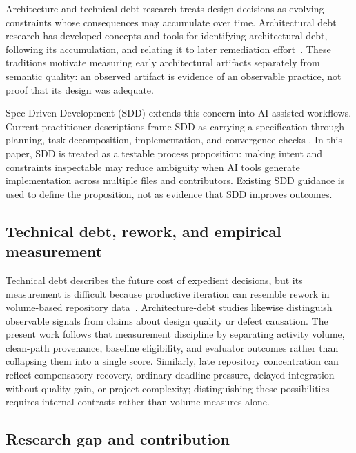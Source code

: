 Architecture and technical-debt research treats design decisions as evolving
constraints whose consequences may accumulate over time. Architectural debt
research has developed concepts and tools for identifying architectural debt,
following its accumulation, and relating it to later remediation
effort~\cite{verdecchia2018architectural,nayebi2019longitudinal}.
These traditions motivate measuring early architectural artifacts separately
from semantic quality: an observed artifact is evidence of an observable
practice, not proof that its design was adequate.

Spec-Driven Development (SDD) extends this concern into AI-assisted workflows.
Current practitioner descriptions frame SDD as carrying a specification through
planning, task decomposition, implementation, and convergence checks
\cite{github2025spec,thoughtworks202Xspec}. In this paper, SDD is treated as a
testable process proposition: making intent and constraints inspectable may
reduce ambiguity when AI tools generate implementation across multiple files
and contributors. Existing SDD guidance is used to define the proposition, not
as evidence that SDD improves outcomes.

\subsection{Technical debt, rework, and empirical measurement}

Technical debt describes the future cost of expedient decisions, but its
measurement is difficult because productive iteration can resemble rework in
volume-based repository data~\cite{cunningham_1992_technical_debt,fowler2009technicaldebt,kruchten2012technicaldebt}.
Architecture-debt studies likewise distinguish observable signals from claims
about design quality or defect causation. The present work follows that
measurement discipline by separating activity volume, clean-path provenance,
baseline eligibility, and evaluator outcomes rather than collapsing them into a
single score. Similarly, late repository concentration can reflect compensatory
recovery, ordinary deadline pressure, delayed integration without quality gain,
or project complexity; distinguishing these possibilities requires internal
contrasts rather than volume measures alone.

\subsection{Research gap and contribution}

